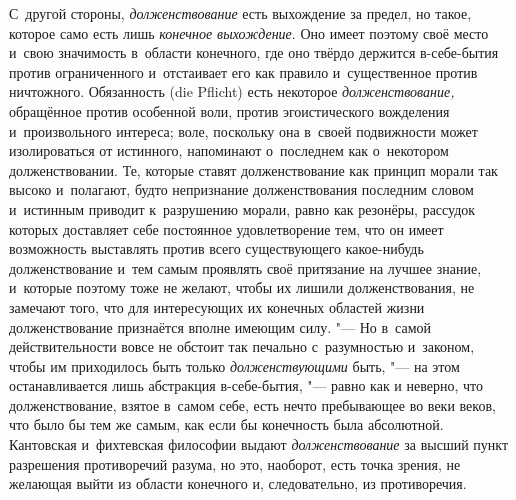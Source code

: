 С~другой стороны, {\em долженствование} есть выхождение
за предел, но такое, которое само есть лишь
{\em конечное выхождение}. Оно имеет поэтому своё место
и~свою значимость в~области конечного, где оно твёрдо держится в-себе-бытия
против ограниченного и~отстаивает его как правило и~существенное против
ничтожного. Обязанность (die Pflicht) есть некоторое
{\em долженствование,} обращённое против особенной
воли, против эгоистического вожделения и~произвольного интереса; воле,
поскольку она в~своей подвижности может изолироваться от истинного,
напоминают о~последнем как о~некотором долженствовании. Те, которые ставят
долженствование как принцип морали так высоко и~полагают, будто непризнание
долженствования последним словом и~истинным приводит к~разрушению морали,
равно как резонёры, рассудок которых доставляет себе постоянное
удовлетворение тем, что он имеет возможность выставлять против всего
существующего какое-нибудь долженствование и~тем самым проявлять своё
притязание на лучшее знание, и~которые поэтому тоже не желают, чтобы их лишили
долженствования, не замечают того, что для интересующих их конечных
областей жизни долженствование признаётся вполне имеющим силу. "--- Но в~самой
действительности вовсе не обстоит так печально с~разумностью и~законом,
чтобы им приходилось быть только {\em долженствующими}
быть, "--- на этом останавливается лишь абстракция в-себе-бытия, "--- равно как и
неверно, что долженствование, взятое в~самом себе, есть нечто пребывающее
во веки веков, что было бы тем же самым, как если бы конечность была
абсолютной. Кантовская и~фихтевская философии выдают
{\em долженствование} за высший пункт разрешения
противоречий разума, но это, наоборот, есть точка зрения, не желающая выйти
из области конечного и, следовательно, из противоречия.


